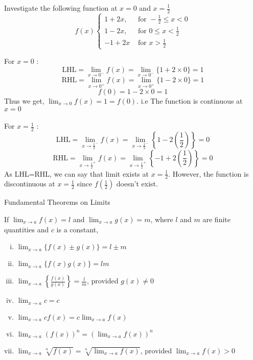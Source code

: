 \begin{example}{
        Investigate the following function at $x=0$ and $x=\frac{1}{2}$ \\
        \begin{equation*}
            f(x)
            \begin{cases}
                1+2x, &\text{ for }-\frac{1}{2}\le x<0 \\
                1-2x, &\text{ for }0\le x<\frac{1}{2} \\
                -1+2x &\text{ for }x>\frac{1}{2}
            \end{cases}
        \end{equation*}
    }

        For $x=0$ :
        \[ \text{LHL} = \lim_{x \to 0^-} f(x) = \lim_{x \to 0^-} \{ 1 + 2 \times 0 \} = 1 \]
        \[ \text{RHL} = \lim_{x \to 0^+} f(x) = \lim_{x \to 0^+} \{ 1 - 2 \times 0 \} = 1 \]
        \[ f(0) = 1-2\times0 = 1 \]
        Thus we get, $\lim_{x \to 0} f(x) = 1 = f(0)$. i.e The function is continuous at $x=0$ \\~\\

        For $x=\frac{1}{2}$ :
        \[ \text{LHL} = \lim_{x \to \frac{1}{2}^-} f(x) = \lim_{x \to \frac{1}{2}^-} \left\{ 1 - 2\left( \frac{1}{2} \right)  \right\} = 0 \]
        \[ \text{RHL} = \lim_{x \to \frac{1}{2}^+} f(x) = \lim_{x \to \frac{1}{2}^+} \left\{ -1 + 2\left( \frac{1}{2} \right)  \right\} = 0 \]
        As LHL=RHL, we can say that limit exists at $x=\frac{1}{2}$. However, the function is discontinuous at $x=\frac{1}{2}$ since $f\left( \frac{1}{2} \right) $ doesn't exist.
\end{example}

\begin{theorem}{Fundamental Theorems on Limits}
    
    If $\lim_{x \to a} f(x) = l$ and $\lim_{x \to a} g(x) = m$, where $l$ and $m$ are finite quantities and $c$ is a constant,
    \begin{enumerate}[(i)]
        \item $ \lim_{x \to a} \{ f(x) \pm g(x) \} = l \pm m $
        \item $ \lim_{x \to a} \{ f(x)g(x) \} = lm $ 
        \item $ \lim_{x \to a} \left\{ \frac{f(x)}{g(x)} \right\} = \frac{l}{m} $, provided $g(x)\neq 0$
        \item $ \lim_{x \to a} c = c $
        \item $ \lim_{x \to a} c f(x) = c \lim_{x \to a} f(x) $
        \item $ \lim_{x \to a} \left( f(x) \right)^n = \left( \lim_{x \to a} f(x) \right)^n $
        \item $ \lim_{x \to a} \sqrt[n]{f(x)} = \sqrt[n]{\lim_{x \to a} f(x)} $, provided $\lim_{x \to a} f(x) > 0$
    \end{enumerate}
\end{theorem}

